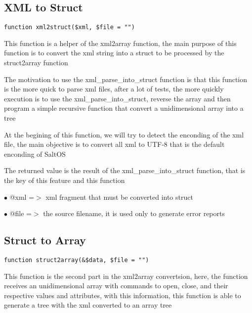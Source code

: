 \documentclass[a4paper]{book}
\begin{document}
\hypertarget{toc285}{}
\subsection{XML to Struct}

\begin{lstlisting}
function xml2struct($xml, $file = "")
\end{lstlisting}

This function is a helper of the xml2array function, the main purpose of this
function is to convert the xml string into a struct to be processed by the
struct2array function

The motivation to use the xml\_parse\_into\_struct function is that this function
is the more quick to parse xml files, after a lot of tests, the more quickly
execution is to use the xml\_parse\_into\_struct, reverse the array and then
program a simple recursive function that convert a unidimensional array into
a tree

At the begining of this function, we will try to detect the enconding of the
xml file, the main objective is to convert all xml to UTF-8 that is the default
enconding of SaltOS

The returned value is the result of the xml\_parse\_into\_struct function, that is
the key of this feature and this function

\begin{compactitem}
\item[\color{myblue}$\bullet$] @xml  =$>$ xml fragment that must be converted into struct
\item[\color{myblue}$\bullet$] @file =$>$ the source filename, it is used only to generate error reports
\end{compactitem}

\hypertarget{toc286}{}
\subsection{Struct to Array}

\begin{lstlisting}
function struct2array(&$data, $file = "")
\end{lstlisting}

This function is the second part in the xml2array convertsion, here, the function
receives an unidimensional array with commands to open, close, and their respective
values and attributes, with this information, this function is able to generate a
tree with the xml converted to an array tree
\end{document}
